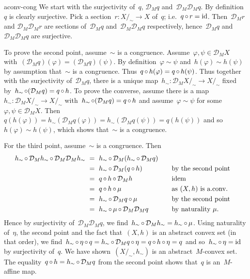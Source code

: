 \begin{solution}{aconv-cong}%
We start with the surjectivity of~$q$, $\mathcal{D}_M q$
    and~$\mathcal{D}_M \mathcal{D}_M q$.
By definition~$q$ is clearly surjective.
Pick a section~$r\colon X/_\sim \to X$ of~$q$;
    i.e.~$q \mathop{\circ} r = \mathrm{id}$.
Then~$\mathcal{D}_M r$
    and $\mathcal{D}_M \mathcal{D}_M r$
    are sections of~$\mathcal{D}_M q$ and~$\mathcal{D}_M \mathcal{D}_M q$
    respectively, hence~$\mathcal{D}_M q$ and~$\mathcal{D}_M \mathcal{D}_M q$
        are surjective.

To prove the second point,
    assume~$\sim$ is a congruence.
Assume~$\varphi, \psi \in \mathcal{D}_M X$ with~$
    (\mathcal{D}_M q)(\varphi) =
    (\mathcal{D}_M q)(\psi) $.
    By definition~$\varphi \sim \psi$ and~$h(\varphi) \sim h(\psi)$
        by assumption that~$\sim$ is a congruence.
    Thus~$q \mathop{\circ} h (\varphi) = q \mathop{\circ} h (\psi)$.
Thus together with the surjectivity of~$\mathcal{D}_M q$,
    there is a unique map~$h_\sim \colon \mathcal{D}_M X/_\sim \to
        X/_\sim$ fixed by~$h_\sim \mathop{\circ} (\mathcal{D}_M q) = q \mathop{\circ} h$.
To prove the converse, assume there is a
    map~$h_\sim \colon \mathcal{D}_M X/_\sim \to
        X/_\sim$ with~$h_\sim \mathop{\circ} (\mathcal{D}_M q) = q \mathop{\circ} h$
            and assume~$\varphi \sim \psi$
            for some~$\varphi,\psi \in \mathcal{D}_M X$.
    Then~$q(h(\varphi))
    = h_\sim (\mathcal{D}_M q(\varphi))
    = h_\sim (\mathcal{D}_M q(\psi))
    = q(h(\psi))$ and so~$h(\varphi) \sim h(\psi)$,
    which shows that~$\sim$ is a congruence.

For the third point, assume~$\sim$ is a congruence.
Then
\begin{alignat*}{3}
    h_\sim \mathop{\circ}
    \mathcal{D}_M h_\sim  \mathop{\circ}
    \mathcal{D}_M \mathcal{D}_M h_\sim 
&\ =\ h_\sim \mathop{\circ}
    \mathcal{D}_M (h_\sim \mathop{\circ} \mathcal{D}_M q)\\
&\ =\ h_\sim \mathop{\circ}
    \mathcal{D}_M (q \mathop{\circ} h) &\quad & \text{by the second point}\\
    &\ =\ q \mathop{\circ} h \mathop{\circ} \mathcal{D}_M h && \text{idem}\\
    &\ =\ q \mathop{\circ} h \mathop{\circ} \mu && \text{as $(X,h)$ is a.conv.}\\
    &\ =\ h_\sim \mathop{\circ} \mathcal{D}_M q \mathop{\circ} \mu && \text{by the second point} \\
    &\ =\ h_\sim \mathop{\circ} \mu \mathop{\circ}
    \mathcal{D}_M \mathcal{D}_M q
    && \text{by naturality~$\mu$.}
\end{alignat*}
    Hence by surjectivity of~$\mathcal{D}_M \mathcal{D}_M q$,
        we find~$h_\sim \mathop{\circ} \mathcal{D}_M h_\sim
            = h_\sim \mathop{\circ} \mu$.
    Using naturality of~$\eta$,
        the second point
            and the fact that~$(X,h)$ is an abstract convex set
            (in that order),
            we find~$h_\sim \mathop{\circ} \eta \mathop{\circ} q
        = h_\sim \mathop{\circ} \mathcal{D}_M q \mathop{\circ} \eta
        = q \mathop{\circ} h \mathop{\circ} \eta
        = q $ and so~$h_\sim \mathop{\circ} \eta = \mathrm{id}$ by surjectivity of~$q$.
We have shown~$(X/_\sim, h_\sim)$ is an abstract~$M$-convex set.
    The equality~$q \mathop{\circ} h = h_\sim \mathop{\circ} \mathcal{D}_M q$
        from the second point shows that~$q$ is
        an~$M$-affine map.
\end{solution}
